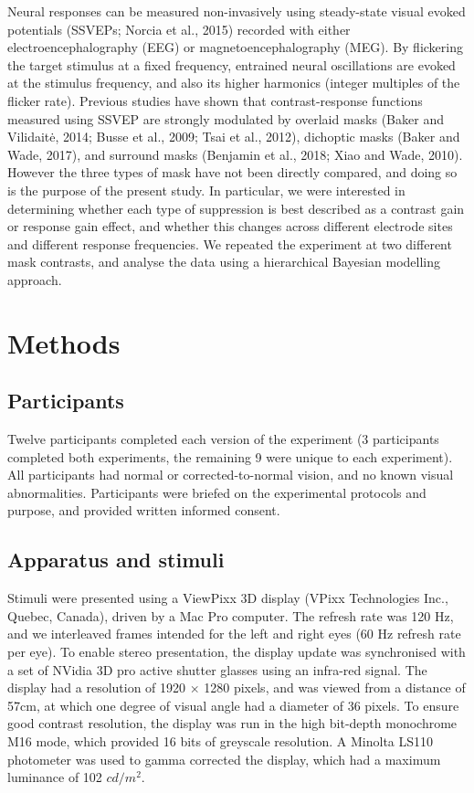 \documentclass[]{article}
\begin{document}
Neural responses can be measured non-invasively using steady-state visual evoked potentials (SSVEPs; Norcia et al., 2015) recorded with either electroencephalography (EEG) or magnetoencephalography (MEG). By flickering the target stimulus at a fixed frequency, entrained neural oscillations are evoked at the stimulus frequency, and also its higher harmonics (integer multiples of the flicker rate). Previous studies have shown that contrast-response functions measured using SSVEP are strongly modulated by overlaid masks (Baker and Vilidaitė, 2014; Busse et al., 2009; Tsai et al., 2012), dichoptic masks (Baker and Wade, 2017), and surround masks (Benjamin et al., 2018; Xiao and Wade, 2010). However the three types of mask have not been directly compared, and doing so is the purpose of the present study. In particular, we were interested in determining whether each type of suppression is best described as a contrast gain or response gain effect, and whether this changes across different electrode sites and different response frequencies. We repeated the experiment at two different mask contrasts, and analyse the data using a hierarchical Bayesian modelling approach.

\hypertarget{methods}{%
\section{Methods}\label{methods}}

\hypertarget{participants}{%
\subsection{Participants}\label{participants}}

Twelve participants completed each version of the experiment (3 participants completed both experiments, the remaining 9 were unique to each experiment). All participants had normal or corrected-to-normal vision, and no known visual abnormalities. Participants were briefed on the experimental protocols and purpose, and provided written informed consent.

\hypertarget{apparatus-and-stimuli}{%
\subsection{Apparatus and stimuli}\label{apparatus-and-stimuli}}

Stimuli were presented using a ViewPixx 3D display (VPixx Technologies Inc., Quebec, Canada), driven by a Mac Pro computer. The refresh rate was 120 Hz, and we interleaved frames intended for the left and right eyes (60 Hz refresh rate per eye). To enable stereo presentation, the display update was synchronised with a set of NVidia 3D pro active shutter glasses using an infra-red signal. The display had a resolution of 1920 \(\times\) 1280 pixels, and was viewed from a distance of 57cm, at which one degree of visual angle had a diameter of 36 pixels. To ensure good contrast resolution, the display was run in the high bit-depth monochrome M16 mode, which provided 16 bits of greyscale resolution. A Minolta LS110 photometer was used to gamma corrected the display, which had a maximum luminance of 102 \(cd/m^2\).
\end{document}
